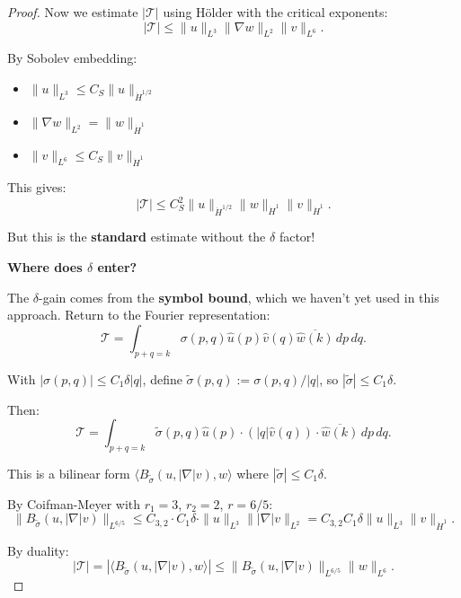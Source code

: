 \documentclass[11pt]{article}
\theoremstyle{definition}
\begin{document}
\begin{proof}
Now we estimate $|\mathcal{T}|$ using Hölder with the critical exponents:
\begin{equation}
|\mathcal{T}| \leq \|u\|_{L^3} \|\nabla w\|_{L^2} \|v\|_{L^6}.
\end{equation}

By Sobolev embedding:
\begin{itemize}
\item $\|u\|_{L^3} \leq C_S \|u\|_{\dot{H}^{1/2}}$
\item $\|\nabla w\|_{L^2} = \|w\|_{\dot{H}^1}$
\item $\|v\|_{L^6} \leq C_S \|v\|_{\dot{H}^1}$
\end{itemize}

This gives:
\begin{equation}
|\mathcal{T}| \leq C_S^2 \|u\|_{\dot{H}^{1/2}} \|w\|_{\dot{H}^1} \|v\|_{\dot{H}^1}.
\end{equation}

But this is the \textbf{standard} estimate without the $\delta$ factor!

\textbf{Where does $\delta$ enter?}

The $\delta$-gain comes from the \textbf{symbol bound}, which we haven't yet used in this approach. Return to the Fourier representation:
\begin{equation}
\mathcal{T} = \int_{p+q=k} \sigma(p,q) \hat{u}(p) \hat{v}(q) \overline{\hat{w}(k)} \, dp \, dq.
\end{equation}

With $|\sigma(p,q)| \leq C_1 \delta |q|$, define $\tilde{\sigma}(p,q) := \sigma(p,q)/|q|$, so $|\tilde{\sigma}| \leq C_1 \delta$.

Then:
\begin{equation}
\mathcal{T} = \int_{p+q=k} \tilde{\sigma}(p,q) \hat{u}(p) \cdot (|q|\hat{v}(q)) \cdot \overline{\hat{w}(k)} \, dp \, dq.
\end{equation}

This is a bilinear form $\langle B_{\tilde{\sigma}}(u, |\nabla|v), w \rangle$ where $|\tilde{\sigma}| \leq C_1\delta$.

By Coifman-Meyer with $r_1 = 3$, $r_2 = 2$, $r = 6/5$:
\begin{equation}
\|B_{\tilde{\sigma}}(u, |\nabla|v)\|_{L^{6/5}} \leq C_{3,2} \cdot C_1\delta \cdot \|u\|_{L^3} \||\nabla|v\|_{L^2} = C_{3,2} C_1 \delta \|u\|_{L^3} \|v\|_{\dot{H}^1}.
\end{equation}

By duality:
\begin{equation}
|\mathcal{T}| = |\langle B_{\tilde{\sigma}}(u, |\nabla|v), w \rangle| \leq \|B_{\tilde{\sigma}}(u, |\nabla|v)\|_{L^{6/5}} \|w\|_{L^6}.
\end{equation}


\end{proof}
\end{document}

